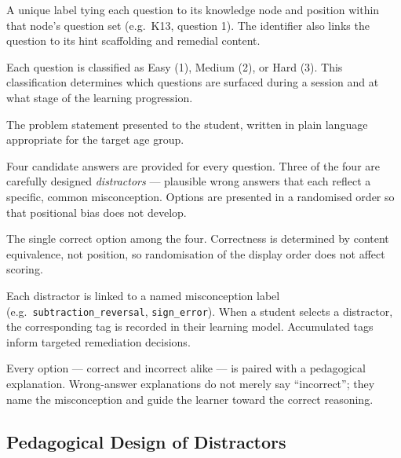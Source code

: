 \documentclass[12pt,a4paper]{article}
\begin{document}
\begin{description}[leftmargin=2em, style=nextline, itemsep=4pt]

  \item[\textbf{Identifier}]
    A unique label tying each question to its knowledge node and position
    within that node's question set (e.g.\ K13, question 1).  The identifier
    also links the question to its hint scaffolding and remedial content.

  \item[\textbf{Difficulty Level}]
    Each question is classified as Easy (1), Medium (2), or Hard (3).  This
    classification determines which questions are surfaced during a session and
    at what stage of the learning progression.

  \item[\textbf{Question Stem}]
    The problem statement presented to the student, written in plain language
    appropriate for the target age group.

  \item[\textbf{Answer Options}]
    Four candidate answers are provided for every question.  Three of the four
    are carefully designed \emph{distractors} — plausible wrong answers that
    each reflect a specific, common misconception.  Options are presented in a
    randomised order so that positional bias does not develop.

  \item[\textbf{Correct Answer}]
    The single correct option among the four.  Correctness is determined by
    content equivalence, not position, so randomisation of the display order
    does not affect scoring.

  \item[\textbf{Error Tags}]
    Each distractor is linked to a named misconception label (e.g.\
    \texttt{subtraction\_reversal}, \texttt{sign\_error}).  When a student
    selects a distractor, the corresponding tag is recorded in their learning
    model.  Accumulated tags inform targeted remediation decisions.

  \item[\textbf{Explanations}]
    Every option — correct and incorrect alike — is paired with a pedagogical
    explanation.  Wrong-answer explanations do not merely say ``incorrect'';
    they name the misconception and guide the learner toward the correct
    reasoning.

\end{description}

\subsection{Pedagogical Design of Distractors}
\end{document}
